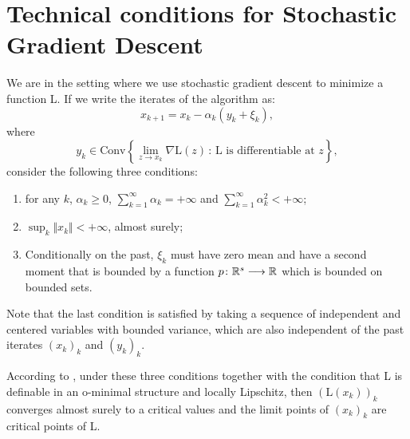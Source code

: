 \section{Technical conditions for Stochastic Gradient Descent}\label{apdx:sgd}
We are in the setting where we use stochastic gradient descent to minimize a function L.
If we write the iterates of the algorithm as: 
$$x_{k+1}=x_k-\alpha_k(y_k+\xi_k),$$
where 
$$y_k\in\text{Conv}\left\{\lim_{z\to x_k}\nabla\text{L}(z)\,:\,\text{L is differentiable at }z\right\},$$
consider the following three conditions: 
\begin{enumerate}
    \item for any $k$, $\alpha_k\geq 0$, $\sum_{k=1}^\infty \alpha_k=+\infty$ and $\sum_{k=1}^\infty \alpha_k^2<+\infty$;
    \item $\sup_k\Vert x_k\Vert<+\infty$, almost surely;
    \item Conditionally on the past, $\xi_k$ must have zero mean and have a second moment that is bounded by a function $p\colon\mathbb{R}^s\longrightarrow\mathbb{R}$ which is bounded on bounded sets. 
\end{enumerate}
Note that the last condition is satisfied by taking a sequence of independent and centered variables with bounded variance, which are also independent of the past iterates $(x_k)_k$ and  $(y_k)_k$.

According to \cite{davis2020stochastic}, under these three conditions together with the condition that L is definable in an o-minimal structure and locally Lipschitz, then $(\text{L}(x_k))_k$ converges almost surely to a critical values and the limit points of $(x_k)_k$ are critical points of L.
